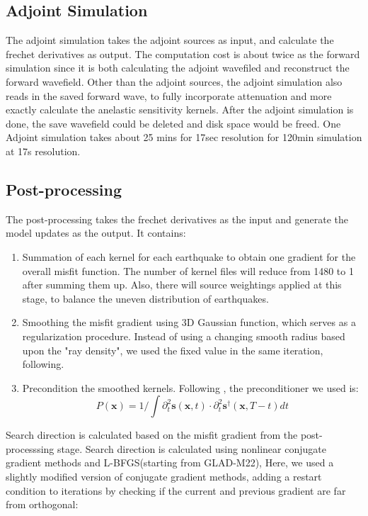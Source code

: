 \documentclass[extra,mreferee]{gji}
\begin{document}
\subsection{Adjoint Simulation}
The adjoint simulation takes the adjoint sources as input, and calculate the frechet
derivatives as output. The computation cost is about twice as the forward simulation since
it is both calculating the adjoint wavefiled and reconstruct the forward wavefield.
Other than the adjoint sources, the adjoint simulation also reads in the saved forward
wave, to fully incorporate attenuation and more exactly calculate the anelastic
sensitivity kernels.
After the adjoint simulation is done, the save wavefield could be deleted and disk
space would be freed.
One Adjoint simulation takes about 25 mins for 17sec resolution for 120min simulation
at 17s resolution.

\subsection{Post-processing}

The post-processing takes the frechet derivatives as the input and generate
the model updates as the output. It contains:
\begin{enumerate}
  \item Summation of each kernel for each earthquake to obtain one
    gradient for the overall misfit function. The number of kernel
    files will reduce from 1480 to 1 after summing them up. Also,
    there will source weightings applied at this stage, to balance
    the uneven distribution of earthquakes.
  \item Smoothing the misfit gradient using 3D Gaussian function, which
    serves as a regularization procedure. Instead of using a changing
    smooth radius based upon the "ray density"\citep{bozdaug2016global},
    we used the fixed value in the same iteration, following\cite{zhu2012structure}.
  \item Precondition the smoothed kernels. Following
    \citep{luo2013strategies, zhu2012structure, bozdaug2016global},
    the preconditioner we used is:
    \begin{equation}
      P(\mathbf{x}) = 1 / \int \partial_t^2 \mathbf{s}(\mathbf{x}, t) \cdot \partial_t^2 \mathbf{s}^\dagger(\mathbf{x}, T-t) dt
    \end{equation}
\end{enumerate}

Search direction is calculated based on the misfit gradient from the
post-processsing stage. Search direction is calculated using nonlinear conjugate
gradient methods\citep{tape2007finite} and L-BFGS(starting from GLAD-M22),
Here, we used a slightly modified version of conjugate gradient methods,
adding a restart condition\citep{wright1999numerical} to iterations by checking
if the current and previous gradient are far from orthogonal:
\end{document}
